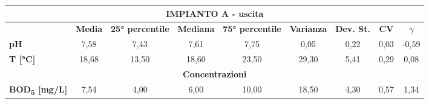 \begin{sidewaystable}[h]
	\scriptsize
	\begin{center}
	\begin{tabular}{lcccccccc}
		\hline
		\multicolumn{9}{|c|}{\textbf{IMPIANTO A - uscita}}                                                                                                                                                                                                                                                                                                                                             \\ \hline
		\multicolumn{1}{l|}{}                                   & \multicolumn{1}{c|}{\textbf{Media}} & \multicolumn{1}{c|}{\textbf{25° percentile}} & \multicolumn{1}{c|}{\textbf{Mediana}} & \multicolumn{1}{c|}{\textbf{75° percentile}} & \multicolumn{1}{c|}{\textbf{Varianza}} & \multicolumn{1}{c|}{\textbf{Dev. St.}} & \multicolumn{1}{c|}{\textbf{CV}} & \multicolumn{1}{c|}{\textbf{$\gamma$}} \\ \hline
		\multicolumn{1}{|l|}{\textbf{pH}}                       & \multicolumn{1}{c|}{7,58}           & \multicolumn{1}{c|}{7,43}                    & \multicolumn{1}{c|}{7,61}             & \multicolumn{1}{c|}{7,75}                    & \multicolumn{1}{c|}{0,05}              & \multicolumn{1}{c|}{0,22}              & \multicolumn{1}{c|}{0,03}        & \multicolumn{1}{c|}{-0,59}          \\ \hline
		\multicolumn{1}{|l|}{\textbf{T {[}°C{]}}}              & \multicolumn{1}{c|}{18,68}          & \multicolumn{1}{c|}{13,50}                   & \multicolumn{1}{c|}{18,60}            & \multicolumn{1}{c|}{23,50}                   & \multicolumn{1}{c|}{29,30}             & \multicolumn{1}{c|}{5,41}              & \multicolumn{1}{c|}{0,29}        & \multicolumn{1}{c|}{0,08}           \\ \hline
		\multicolumn{9}{|c|}{\textbf{Concentrazioni}}                                                                                                                                                                                                                                                                                                                                                  \\ \hline
		\multicolumn{1}{|l|}{\textbf{BOD\textsubscript{5} {[}mg/L{]}}}          & \multicolumn{1}{c|}{7,54}           & \multicolumn{1}{c|}{4,00}                    & \multicolumn{1}{c|}{6,00}             & \multicolumn{1}{c|}{10,00}                   & \multicolumn{1}{c|}{18,50}             & \multicolumn{1}{c|}{4,30}              & \multicolumn{1}{c|}{0,57}        & \multicolumn{1}{c|}{1,34}           \\ \hline

\end{tabular}
\end{center}
\end{sidewaystable}
